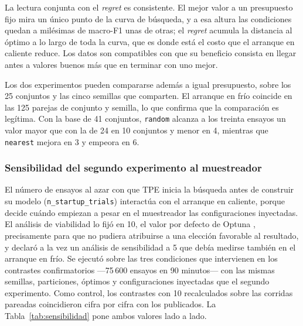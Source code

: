 \documentclass[12pt,letterpaper,oneside]{article}
\begin{document}
La lectura conjunta con el \textit{regret} es consistente. El mejor valor a un presupuesto fijo
mira un único punto de la curva de búsqueda, y a esa altura las condiciones quedan a milésimas
de macro-F1 unas de otras; el \textit{regret} acumula la distancia al óptimo a lo largo de toda
la curva, que es donde está el costo que el arranque en caliente reduce. Los datos son
compatibles con que su beneficio consista en llegar antes a valores buenos más que en terminar
con uno mejor.

Los dos experimentos pueden compararse además a igual presupuesto, sobre los 25 conjuntos y
las cinco semillas que comparten. El arranque en frío coincide en las 125 parejas de conjunto
y semilla, lo que confirma que la comparación es legítima. Con la base de 41 conjuntos,
\texttt{random} alcanza a los treinta ensayos un valor mayor que con la de 24 en 10 conjuntos y
menor en 4, mientras que \texttt{nearest} mejora en 3 y empeora en 6.

\subsubsection{Sensibilidad del segundo experimento al muestreador}
\label{sec:resultados-sensibilidad}

El número de ensayos al azar con que TPE inicia la búsqueda antes de construir su modelo
(\texttt{n\_startup\_trials}) interactúa con el arranque en caliente, porque decide cuándo
empiezan a pesar en el muestreador las configuraciones inyectadas. El análisis de viabilidad lo
fijó en 10, el valor por defecto de Optuna \cite{akiba2019optuna}, precisamente para que no
pudiera atribuirse a una elección favorable al resultado, y declaró a la vez un análisis de
sensibilidad a 5 que debía medirse también en el arranque en frío. Se ejecutó sobre las tres
condiciones que intervienen en los contrastes confirmatorios ---75\,600 ensayos en 90
minutos--- con las mismas semillas, particiones, óptimos y configuraciones inyectadas que el
segundo experimento. Como control, los contrastes con 10 recalculados sobre las corridas
pareadas coincidieron cifra por cifra con los publicados. La Tabla~\ref{tab:sensibilidad} pone
ambos valores lado a lado.
\end{document}
